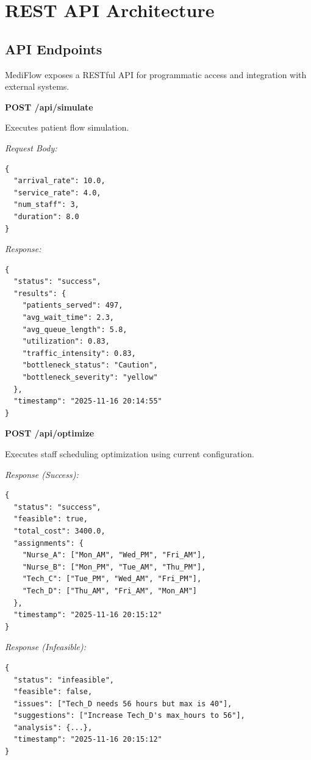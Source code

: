 \documentclass[12pt,a4paper]{article}
\begin{document}
\newpage

\section{REST API Architecture}
\label{sec:api}

\subsection{API Endpoints}
\label{subsec:endpoints}

MediFlow exposes a RESTful API for programmatic access and integration with external systems.

\vspace{0.5em}

\textbf{POST /api/simulate}

Executes patient flow simulation.

\textit{Request Body:}
\begin{lstlisting}
{
  "arrival_rate": 10.0,
  "service_rate": 4.0,
  "num_staff": 3,
  "duration": 8.0
}
\end{lstlisting}

\textit{Response:}
\begin{lstlisting}
{
  "status": "success",
  "results": {
    "patients_served": 497,
    "avg_wait_time": 2.3,
    "avg_queue_length": 5.8,
    "utilization": 0.83,
    "traffic_intensity": 0.83,
    "bottleneck_status": "Caution",
    "bottleneck_severity": "yellow"
  },
  "timestamp": "2025-11-16 20:14:55"
}
\end{lstlisting}

\textbf{POST /api/optimize}

Executes staff scheduling optimization using current configuration.

\textit{Response (Success):}
\begin{lstlisting}
{
  "status": "success",
  "feasible": true,
  "total_cost": 3400.0,
  "assignments": {
    "Nurse_A": ["Mon_AM", "Wed_PM", "Fri_AM"],
    "Nurse_B": ["Mon_PM", "Tue_AM", "Thu_PM"],
    "Tech_C": ["Tue_PM", "Wed_AM", "Fri_PM"],
    "Tech_D": ["Thu_AM", "Fri_AM", "Mon_AM"]
  },
  "timestamp": "2025-11-16 20:15:12"
}
\end{lstlisting}

\textit{Response (Infeasible):}
\begin{lstlisting}
{
  "status": "infeasible",
  "feasible": false,
  "issues": ["Tech_D needs 56 hours but max is 40"],
  "suggestions": ["Increase Tech_D's max_hours to 56"],
  "analysis": {...},
  "timestamp": "2025-11-16 20:15:12"
}
\end{lstlisting}
\end{document}
